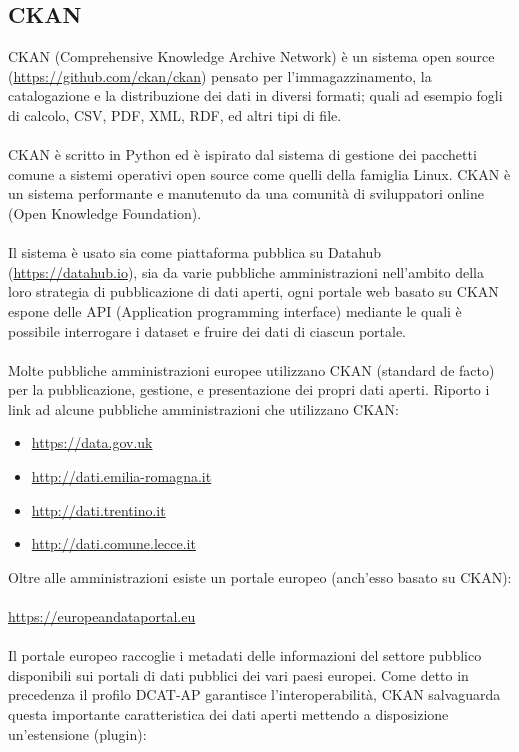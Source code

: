 \documentclass{article}
\theoremstyle{plain}
\theoremstyle{definition}
\begin{document}
\subsection{CKAN}
CKAN (Comprehensive Knowledge Archive Network) è un sistema open source (\url{https://github.com/ckan/ckan}) pensato per l'immagazzinamento, la catalogazione e la distribuzione dei dati in diversi formati; quali ad esempio fogli di calcolo, CSV, PDF, XML, RDF, ed altri tipi di file.
\\
\\
CKAN è scritto in Python ed è ispirato dal sistema di gestione dei pacchetti comune a sistemi operativi open source come quelli della famiglia Linux. CKAN è un sistema performante e manutenuto da una comunità di sviluppatori online (Open Knowledge Foundation).  
\\
\\
Il sistema è usato sia come piattaforma pubblica su Datahub (\url{https://datahub.io}), sia da varie pubbliche amministrazioni nell'ambito della loro strategia di pubblicazione di dati aperti, ogni portale web basato su CKAN espone delle API (Application programming interface) mediante le quali è possibile interrogare i dataset e fruire dei dati di ciascun portale. 
\\
\\
Molte pubbliche amministrazioni europee utilizzano CKAN (standard de facto) per la pubblicazione, gestione, e presentazione dei propri dati aperti. Riporto i link ad alcune pubbliche amministrazioni che utilizzano CKAN:
\begin{itemize}

\item \url{https://data.gov.uk}
\item \url{http://dati.emilia-romagna.it}
\item \url{http://dati.trentino.it}
\item \url{http://dati.comune.lecce.it}
\end{itemize}
Oltre alle amministrazioni esiste un portale europeo (anch'esso basato su CKAN):
\\
\\
\url{https://europeandataportal.eu}
\\
\\
Il portale europeo raccoglie i metadati delle informazioni del settore pubblico disponibili sui portali di dati pubblici dei vari paesi europei.
Come detto in precedenza il profilo DCAT-AP garantisce l'interoperabilità, CKAN salvaguarda questa importante caratteristica dei dati aperti mettendo a disposizione un'estensione (plugin):
\end{document}
